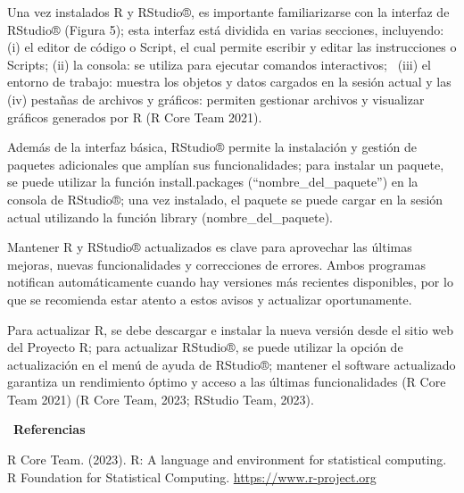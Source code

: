 \documentclass[
  letterpaper,
  DIV=11,
  numbers=noendperiod]{scrreprt}
\begin{document}
Una vez instalados R y RStudio®, es importante familiarizarse con la
interfaz de RStudio® (Figura 5); esta interfaz está dividida en varias
secciones, incluyendo: (i) el editor de código o Script, el cual permite
escribir y editar las instrucciones o Scripts; (ii) la consola: se
utiliza para ejecutar comandos interactivos; ~(iii) el entorno de
trabajo: muestra los objetos y datos cargados en la sesión actual y las
(iv) pestañas de archivos y gráficos: permiten gestionar archivos y
visualizar gráficos generados por R (R Core Team 2021).

Además de la interfaz básica, RStudio® permite la instalación y gestión
de paquetes adicionales que amplían sus funcionalidades; para instalar
un paquete, se puede utilizar la función install.packages
(``nombre\_del\_paquete'') en la consola de RStudio®; una vez instalado,
el paquete se puede cargar en la sesión actual utilizando la función
library (nombre\_del\_paquete).

\begin{tcolorbox}[enhanced jigsaw, toptitle=1mm, colbacktitle=quarto-callout-important-color!10!white, breakable, opacityback=0, toprule=.15mm, coltitle=black, colframe=quarto-callout-important-color-frame, bottomtitle=1mm, bottomrule=.15mm, titlerule=0mm, title=\textcolor{quarto-callout-important-color}{\faExclamation}\hspace{0.5em}{Important}, colback=white, arc=.35mm, rightrule=.15mm, leftrule=.75mm, left=2mm, opacitybacktitle=0.6]

Mantener R y RStudio® actualizados es clave para aprovechar las últimas
mejoras, nuevas funcionalidades y correcciones de errores. Ambos
programas notifican automáticamente cuando hay versiones más recientes
disponibles, por lo que se recomienda estar atento a estos avisos y
actualizar oportunamente.

\end{tcolorbox}

Para actualizar R, se debe descargar e instalar la nueva versión desde
el sitio web del Proyecto R; para actualizar RStudio®, se puede utilizar
la opción de actualización en el menú de ayuda de RStudio®; mantener el
software actualizado garantiza un rendimiento óptimo y acceso a las
últimas funcionalidades (R Core Team 2021) (R Core Team, 2023; RStudio
Team, 2023).

~\textbf{Referencias}

R Core Team. (2023). R: A language and environment for statistical
computing. R Foundation for Statistical Computing.
\url{https://www.r-project.org}
\end{document}
